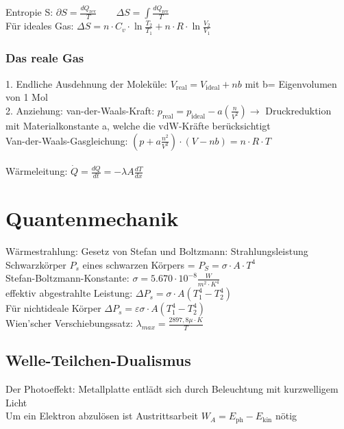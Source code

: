 \documentclass[fs, footer]{latex4ei}
\begin{document}
\begin{multicols*}{4}
Entropie S: $\partial S = \frac{dQ_{\text{rev}}}{T} \qquad \Delta S = \int \frac{dQ_{\text{rev}}}{T}$\\
Für ideales Gas: $\Delta S = n\cdot C_v\cdot\ln\frac{T_2}{T_1} + n\cdot R\cdot\ln\frac{V_2}{V_1}$\\
\subsubsection{Das reale Gas}
1. Endliche Ausdehnung der Moleküle: $V_{\text{real}} = V_{\text{ideal}} + nb$ mit b= Eigenvolumen von 1 Mol\\
2. Anziehung: van-der-Waals-Kraft: $p_{\text{real}} = p_{\text{ideal}} - a(\frac{n}{V^2}) \rightarrow$ Druckreduktion\\
mit Materialkonstante a, welche die vdW-Kräfte berücksichtigt\\

Van-der-Waals-Gasgleichung: $(p+a\frac{n^2}{V^2})\cdot(V-nb) = n\cdot R\cdot T$\\
\\
Wärmeleitung: $\dot Q = \frac{dQ}{dt} = - \lambda  A \frac{dT}{dx}$\\



\section{Quantenmechanik}

Wärmestrahlung: Gesetz von Stefan und Boltzmann: 
Strahlungsleistung Schwarzkörper $P_s$ eines schwarzen Körpers = $ P_S = \sigma\cdot A\cdot T^4 $\\
Stefan-Boltzmann-Konstante: $\sigma = 5.670 \cdot 10^{-8}\frac{W}{m^2\cdot K^4}$\\
effektiv abgestrahlte Leistung: $\Delta P_s = \sigma\cdot A (T_1^4-T_2^4)$\\

Für nichtideale Körper $\Delta P_s = \varepsilon\sigma\cdot A (T_1^4-T_2^4)$\\
Wien'scher Verschiebungssatz: $\lambda_{max} = \frac{2897,8\mu\cdot K}{T}$\\

\subsection{Welle-Teilchen-Dualismus}
Der Photoeffekt: Metallplatte entlädt sich durch Beleuchtung mit kurzwelligem Licht\\
Um ein Elektron abzulösen ist Austrittsarbeit $W_A = E_{\text{ph}} - E_{\text{kin}}$ nötig\\


\end{multicols*}
\end{document}
